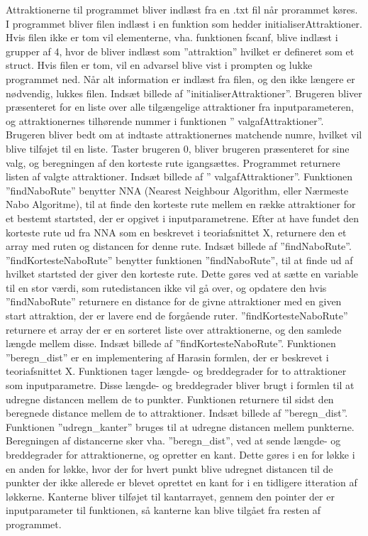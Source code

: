 Attraktionerne til programmet bliver indlæst fra en .txt fil når prorammet køres. I programmet bliver filen indlæst i en funktion som hedder initialiserAttraktioner. Hvis filen ikke er tom vil elementerne, vha. funktionen fscanf, blive indlæst i grupper af 4, hvor de bliver indlæst som ”attraktion” hvilket er defineret som et struct. Hvis filen er tom, vil en advarsel blive vist i prompten og lukke programmet ned. Når alt information er indlæst fra filen, og den ikke længere er nødvendig, lukkes filen.
Indsæt billede af ”initialiserAttraktioner”.
Brugeren bliver præsenteret for en liste over alle tilgængelige attraktioner fra inputparameteren, og attraktionernes tilhørende nummer i funktionen ” valgafAttraktioner”. Brugeren bliver bedt om at indtaste attraktionernes matchende numre, hvilket vil blive tilføjet til en liste. Taster brugeren 0, bliver brugeren præsenteret for sine valg, og beregningen af den korteste rute igangsættes. Programmet returnere listen af valgte attraktioner.
Indsæt billede af ” valgafAttraktioner”.	
Funktionen ”findNaboRute” benytter NNA (Nearest Neighbour Algorithm, eller Nærmeste Nabo Algoritme), til at finde den korteste rute mellem en række attraktioner for et bestemt startsted, der er opgivet i inputparametrene. Efter at have fundet den korteste rute ud fra NNA som en beskrevet i teoriafsnittet X, returnere den et array med ruten og distancen for denne rute. 
Indsæt billede af ”findNaboRute”.
”findKortesteNaboRute” benytter funktionen ”findNaboRute”, til at finde ud af hvilket startsted der giver den korteste rute. Dette gøres ved at sætte en variable til en stor værdi, som rutedistancen ikke vil gå over, og opdatere den hvis ”findNaboRute” returnere en distance for de givne attraktioner med en given start attraktion, der er lavere end de forgående ruter. ”findKortesteNaboRute” returnere et array der er en sorteret liste over attraktionerne, og den samlede længde mellem disse. 
Indsæt billede af ”findKortesteNaboRute”. \newline
Funktionen ”beregn\_dist” er en implementering af Harasin formlen, der er beskrevet i teoriafsnittet X. Funktionen tager længde- og breddegrader for to attraktioner som inputparametre. Disse længde- og breddegrader bliver brugt i formlen til at udregne distancen mellem de to punkter. Funktionen returnere til sidst den beregnede distance mellem de to attraktioner.
Indsæt billede af ”beregn\_dist”.
Funktionen ”udregn\_kanter” bruges til at udregne distancen mellem punkterne. Beregningen af distancerne sker vha. ”beregn\_dist”, ved at sende længde- og breddegrader for attraktionerne, og opretter en kant. Dette gøres i en for løkke i en anden for løkke, hvor der for hvert punkt blive udregnet distancen til de punkter der ikke allerede er blevet oprettet en kant for i en tidligere itteration af løkkerne. Kanterne bliver tilføjet til kantarrayet, gennem den pointer der er inputparameter til funktionen, så kanterne kan blive tilgået fra resten af programmet. 
